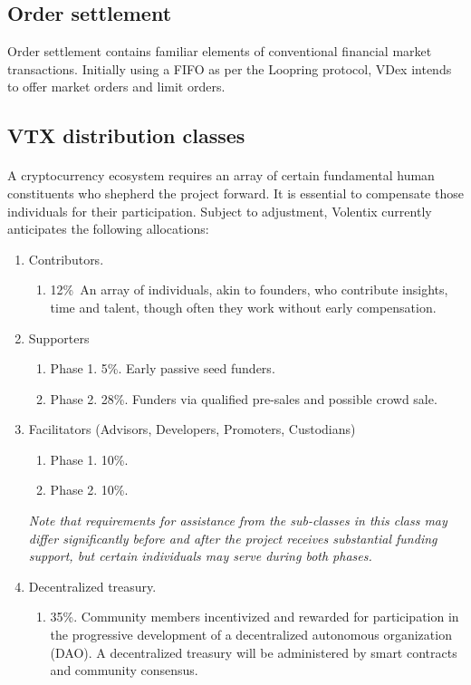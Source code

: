 \documentclass[]{article}
\begin{document}
{\subsection{Order settlement}
Order settlement contains familiar elements of conventional financial market transactions. Initially using a FIFO as per the Loopring protocol, VDex intends to offer market orders and limit orders. 

\subsection{VTX distribution classes}

\paragraph {}
A cryptocurrency ecosystem requires an array of certain fundamental human constituents who shepherd the project forward. \cite{27}   It is essential to compensate those individuals for their participation. Subject to adjustment, Volentix currently anticipates the following allocations:  
\begin{enumerate}
	\item Contributors. 
	\begin{enumerate}
		\item  12\%\ An array of individuals, akin to founders, who contribute insights, time and talent, though often they work without early compensation. 
	\end{enumerate}
	
	\item Supporters\
	\begin{enumerate}
		\item Phase 1. 5\%. Early passive seed funders.
		\item Phase 2. 28\%. Funders via qualified pre-sales and possible crowd sale.  
	\end{enumerate}
	\item {Facilitators} 
	(Advisors, Developers, Promoters, Custodians)\
	\begin{enumerate}
		\item Phase 1. 10\%. 
		\item Phase 2. 10\%. \
	\end{enumerate}
	\textit{Note that requirements for assistance from the sub-classes in this class may differ significantly before and after the project receives substantial funding support, but certain individuals may serve during both phases. }
	\item Decentralized treasury. 
	\begin{enumerate}
		\item 35\%. Community members incentivized and rewarded for participation in the progressive development of a decentralized autonomous organization (DAO). A decentralized treasury will be administered by smart contracts and community consensus.
		

\end{enumerate}
\end{enumerate}}
\end{document}
